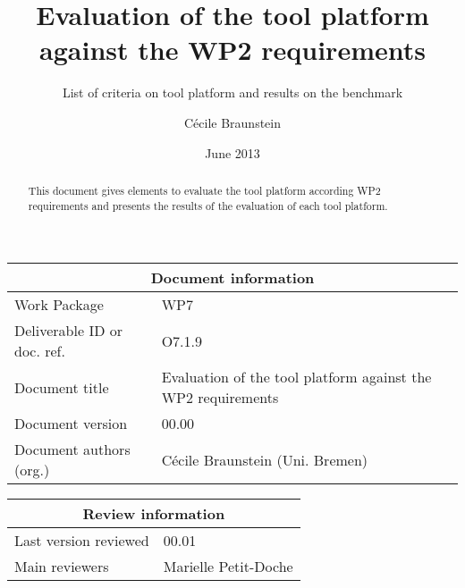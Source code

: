 \documentclass{openetcs_report}
\begin{document}
\frontmatter
{}





\title{Evaluation of the tool platform against the WP2 requirements }

\subtitle{List of criteria on tool platform and results on the benchmark}

\date{June 2013}


\author{C\'ecile Braunstein}

 


\begin{abstract}
This document gives elements to evaluate the tool platform according
WP2 requirements and presents the results of the evaluation of each
tool platform.
\end{abstract}

\maketitle
\tableofcontents
\listoffiguresandtables
\newpage


\begin{tabular}{|p{4.4cm}|p{8.7cm}|}
\hline
\multicolumn{2}{|c|}{Document information} \\
\hline
Work Package &  WP7  \\
Deliverable ID or doc. ref. & O7.1.9\\
\hline
Document title & Evaluation of the tool platform against the WP2 requirements \\
Document version & 00.00 \\
Document authors (org.)  & C\'ecile Braunstein (Uni. Bremen)  \\
\hline
\end{tabular}

\begin{tabular}{|p{4.4cm}|p{8.7cm}|}
\hline
\multicolumn{2}{|c|}{Review information} \\
\hline
Last version reviewed & 00.01 \\
\hline
Main reviewers & Marielle Petit-Doche\\
 \hline
\end{tabular}
\end{document}
